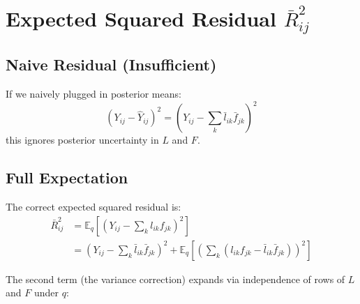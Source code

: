 \documentclass[11pt]{article}
\newcommand{\lbar}[2]{\bar{l}_{#1#2}}
\newcommand{\fbar}[2]{\bar{f}_{#1#2}}
\begin{document}
\section{Expected Squared Residual $\bar{R}^2_{ij}$}\label{sec:r2bar}

\subsection{Naive Residual (Insufficient)}

If we naively plugged in posterior means:
\begin{equation}
  (Y_{ij} - \hat{Y}_{ij})^2
  = \left(Y_{ij} - \sum_k\lbar{i}{k}\fbar{j}{k}\right)^2
  \label{eq:naive}
\end{equation}
this ignores posterior uncertainty in $L$ and $F$.

\subsection{Full Expectation}

The correct expected squared residual is:
\begin{align}
  \bar{R}^2_{ij}
  &= \mathbb{E}_q\!\left[\left(Y_{ij} - \sum_k l_{ik}f_{jk}\right)^2\right]
  \nonumber\\
  &= \left(Y_{ij} - \sum_k\lbar{i}{k}\fbar{j}{k}\right)^2
     + \mathbb{E}_q\!\left[\left(\sum_k(l_{ik}f_{jk} - \lbar{i}{k}\fbar{j}{k})\right)^2\right]
  \label{eq:r2bar-split}
\end{align}

The second term (the variance correction) expands via independence of rows of $L$ and $F$ under $q$:
\end{document}
